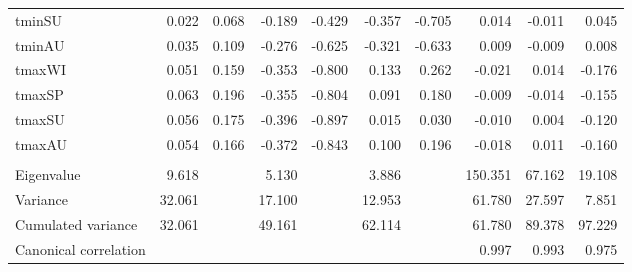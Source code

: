 \begin{table}
\begin{table}[H]
{\begin{tabular}{lrrrrrrrrr}
\hspace{1em}tminSU & 0.022 & 0.068 & -0.189 & -0.429 & -0.357 & -0.705 & 0.014 & -0.011 & 0.045\\
\hspace{1em}tminAU & 0.035 & 0.109 & -0.276 & -0.625 & -0.321 & -0.633 & 0.009 & -0.009 & 0.008\\
\hspace{1em}tmaxWI & 0.051 & 0.159 & -0.353 & -0.800 & 0.133 & 0.262 & -0.021 & 0.014 & -0.176\\
\hspace{1em}tmaxSP & 0.063 & 0.196 & -0.355 & -0.804 & 0.091 & 0.180 & -0.009 & -0.014 & -0.155\\
\hspace{1em}tmaxSU & 0.056 & 0.175 & -0.396 & -0.897 & 0.015 & 0.030 & -0.010 & 0.004 & -0.120\\
\hspace{1em}tmaxAU & 0.054 & 0.166 & -0.372 & -0.843 & 0.100 & 0.196 & -0.018 & 0.011 & -0.160\\
\addlinespace[0.3em]
\multicolumn{10}{l}{\textbf{}}\\
\hspace{1em}Eigenvalue & 9.618 &  & 5.130 &  & 3.886 &  & 150.351 & 67.162 & 19.108\\
\hspace{1em}Variance & 32.061 &  & 17.100 &  & 12.953 &  & 61.780 & 27.597 & 7.851\\
\hspace{1em}Cumulated variance & 32.061 &  & 49.161 &  & 62.114 &  & 61.780 & 89.378 & 97.229\\
\hspace{1em}Canonical correlation &  &  &  &  &  &  & 0.997 & 0.993 & 0.975\\
\bottomrule
\end{tabular}}
\end{table}
\label{tab:multivar:tpca}
\end{table}

